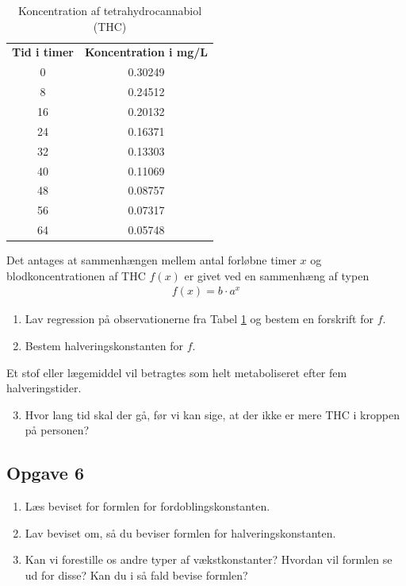 \begin{table}[H]
	\centering
	\begin{tabular}{cc}
		\textbf{Tid i timer} & \textbf{Koncentration i mg/L} \\

		0 & 0.30249 \\

		8 & 0.24512 \\
 
		16 &  0.20132 \\

		24 & 0.16371 \\

		32 & 0.13303\\

		40 & 0.11069\\

		48 & 0.08757\\
		56 & 0.07317\\

		64 & 0.05748
	\end{tabular}
	\caption{Koncentration af tetrahydrocannabiol (THC)}
	\label{tab:cannabis}
\end{table}

Det antages at sammenhængen mellem antal forløbne timer $x$ og blodkoncentrationen af THC $f(x)$ er givet ved en sammenhæng af typen
\begin{align*}
	f(x) = b \cdot a^x
\end{align*}
\begin{enumerate}[label=\roman*)]
	\item Lav regression på observationerne fra Tabel \ref{tab:cannabis} og bestem en forskrift for $f$.
	\item Bestem halveringskonstanten for $f$.
\end{enumerate}
Et stof eller lægemiddel vil betragtes som helt metaboliseret efter fem halveringstider.

\begin{enumerate}[label=\roman*)]
	\setcounter{enumi}{2}
	\item Hvor lang tid skal der gå, før vi kan sige, at der ikke er mere THC i kroppen på personen?
\end{enumerate}

\subsection*{Opgave 6}

\begin{enumerate}[label=\roman*)]
	\item Læs beviset for formlen for fordoblingskonstanten.
	\item Lav beviset om, så du beviser formlen for halveringskonstanten. 
	\item Kan vi forestille os andre typer af vækstkonstanter? Hvordan vil formlen se ud for disse? Kan du 
	i så fald bevise formlen?
\end{enumerate}
